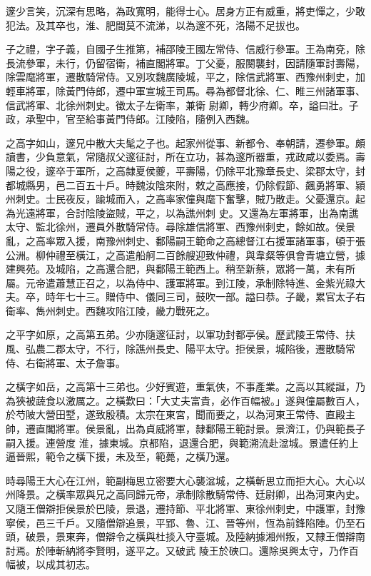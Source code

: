 \begin{pinyinscope}
 邃少言笑，沉深有思略，為政寬明，能得士心。居身方正有威重，將吏憚之，少敢犯法。及其卒也，淮、肥間莫不流涕，以為邃不死，洛陽不足拔也。



 子之禮，字子義，自國子生推第，補邵陵王國左常侍、信威行參軍。王為南兗，除長流參軍，未行，仍留宿衛，補直閣將軍。丁父憂，服闋襲封，因請隨軍討壽陽，除雲麾將軍，遷散騎常侍。又別攻魏廣陵城，平之，除信武將軍、西豫州刺史，加輕車將軍，除黃門侍郎，遷中軍宣城王司馬。尋為都督北徐、仁、睢三州諸軍事、信武將軍、北徐州刺史。徵太子左衛率，兼衛
 尉卿，轉少府卿。卒，謚曰壯。子政，承聖中，官至給事黃門侍郎。江陵陷，隨例入西魏。



 之高字如山，邃兄中散大夫髦之子也。起家州從事、新都令、奉朝請，遷參軍。頗讀書，少負意氣，常隨叔父邃征討，所在立功，甚為邃所器重，戎政咸以委焉。壽陽之役，邃卒于軍所，之高隸夏侯夔，平壽陽，仍除平北豫章長史、梁郡太守，封都城縣男，邑二百五十戶。時魏汝陰來附，敕之高應接，仍除假節、飆勇將軍、潁州刺史。士民夜反，踰城而入，之高率家僮與麾下奮擊，賊乃散走。父憂還京。起為光遠將軍，合討陰陵盜賊，平之，以為譙州刺
 史。又還為左軍將軍，出為南譙太守、監北徐州，遷員外散騎常侍。尋除雄信將軍、西豫州刺史，餘如故。侯景亂，之高率眾入援，南豫州刺史、鄱陽嗣王範命之高總督江右援軍諸軍事，頓于張公洲。柳仲禮至橫江，之高遣船舸二百餘艘迎致仲禮，與韋粲等俱會青塘立營，據建興苑。及城陷，之高還合肥，與鄱陽王範西上。稍至新蔡，眾將一萬，未有所屬。元帝遣蕭慧正召之，以為侍中、護軍將軍。到江陵，承制除特進、金紫光祿大夫。卒，時年七十三。贈侍中、儀同三司，鼓吹一部。謚曰恭。子畿，累官太子右衛率、雋州刺史。西魏攻陷江陵，畿力戰死之。



 之平字如原，之高第五弟。少亦隨邃征討，以軍功封都亭侯。歷武陵王常侍、扶風、弘農二郡太守，不行，除譙州長史、陽平太守。拒侯景，城陷後，遷散騎常侍、右衛將軍、太子詹事。



 之橫字如岳，之高第十三弟也。少好賓遊，重氣俠，不事產業。之高以其縱誕，乃為狹被蔬食以激厲之。之橫歎曰：「大丈夫富貴，必作百幅被。」遂與僮屬數百人，於芍陂大營田墅，遂致殷積。太宗在東宮，聞而要之，以為河東王常侍、直殿主帥，遷直閣將軍。侯景亂，出為貞威將軍，隸鄱陽王範討景。景濟江，仍與範長子嗣入援。連營度
 淮，據東城。京都陷，退還合肥，與範溯流赴湓城。景遣任約上逼晉熙，範令之橫下援，未及至，範薨，之橫乃還。



 時尋陽王大心在江州，範副梅思立密要大心襲湓城，之橫斬思立而拒大心。大心以州降景。之橫率眾與兄之高同歸元帝，承制除散騎常侍、廷尉卿，出為河東內史。又隨王僧辯拒侯景於巴陵，景退，遷持節、平北將軍、東徐州刺史，中護軍，封豫寧侯，邑三千戶。又隨僧辯追景，平郢、魯、江、晉等州，恆為前鋒陷陣。仍至石頭，破景，景東奔，僧辯令之橫與杜掞入守臺城。及陸納據湘州叛，又隸王僧辯南討焉。於陣斬納將李賢明，遂平之。又破武
 陵王於硤口。還除吳興太守，乃作百幅被，以成其初志。




\end{pinyinscope}
